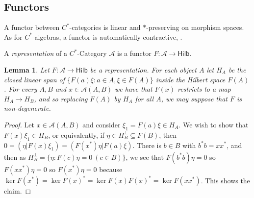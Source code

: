 \documentclass[a4paper,11pt]{article}
\theoremstyle{plain}
\newtheorem{lemma}[proposition]{Lemma}
\newtheorem{definition}[proposition]{Definition}
\theoremstyle{remark}
\newcommand{\mc}[1]{\mathcal{#1}}
\newcommand{\catHilb}{\textsf{Hilb}}
\begin{document}



\subsection{Functors}

A functor between $C^*$-categories is linear and $*$-preserving on morphism spaces.  As for $C^*$-algebras, a functor is automatically contractive, \cite[Proposition~2.14]{mitchener_cstar_cats}.

A \emph{representation} of a $C^*$-Category $\mc A$ is a functor $F\colon\mc A \to \catHilb$.

\begin{lemma}
Let $F\colon\mc A \to \catHilb$ be a representation.  For each object $A$ let $H_A$ be the closed linear span of $\{ F(a)\xi : a\in A, \xi\in F(A) \}$ inside the Hilbert space $F(A)$.  For every $A,B$ and $x\in\mc A(A,B)$ we have that $F(x)$ restricts to a map $H_A \to H_B$, and so replacing $F(A)$ by $H_A$ for all $A$, we may suppose that $F$ is non-degenerate.
\end{lemma}
\begin{proof}
Let $x\in\mc A(A,B)$ and consider $\xi_1 = F(a)\xi \in H_A$.  We wish to show that $F(x)\xi_1 \in H_B$, or equivalently, if $\eta\in H_B^\perp \subseteq F(B)$, then $0 = (\eta|F(x)\xi_1) = (F(x^*)\eta | F(a)\xi)$.  There is $b\in B$ with $b^*b = xx^*$, and then as $H_B^\perp = \{ \eta : F(c)\eta=0 \ (c\in B)\}$, we see that $F(b^*b)\eta=0$ so $F(xx^*)\eta=0$ so $F(x^*)\eta=0$ because $\ker F(x^*) = \ker F(x)^* = \ker F(x) F(x)^* = \ker F(xx^*)$.  This shows the claim.
\end{proof}
\end{document}
